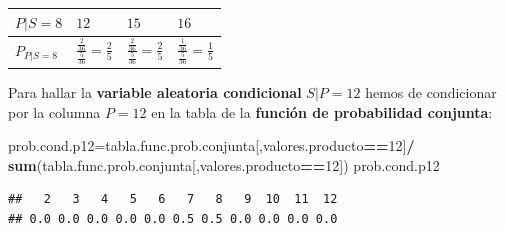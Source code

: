 \documentclass[]{book}
\newenvironment{Shaded}{\begin{snugshade}}{\end{snugshade}}
\newcommand{\DecValTok}[1]{\textcolor[rgb]{0.00,0.00,0.81}{#1}}
\newcommand{\KeywordTok}[1]{\textcolor[rgb]{0.13,0.29,0.53}{\textbf{#1}}}
\newcommand{\NormalTok}[1]{#1}
\newcommand{\OperatorTok}[1]{\textcolor[rgb]{0.81,0.36,0.00}{\textbf{#1}}}
\newcommand{\StringTok}[1]{\textcolor[rgb]{0.31,0.60,0.02}{#1}}
\begin{document}
\begin{longtable}[]{@{}llll@{}}
\toprule
\begin{minipage}[b]{0.22\columnwidth}\raggedright
\(P|S=8\)\strut
\end{minipage} & \begin{minipage}[b]{0.22\columnwidth}\raggedright
\(12\)\strut
\end{minipage} & \begin{minipage}[b]{0.22\columnwidth}\raggedright
\(15\)\strut
\end{minipage} & \begin{minipage}[b]{0.22\columnwidth}\raggedright
\(16\)\strut
\end{minipage}\tabularnewline
\midrule
\endhead
\begin{minipage}[t]{0.22\columnwidth}\raggedright
\(P_{P|S=8}\)\strut
\end{minipage} & \begin{minipage}[t]{0.22\columnwidth}\raggedright
\(\frac{\frac{2}{36}}{\frac{5}{36}}=\frac{2}{5}\)\strut
\end{minipage} & \begin{minipage}[t]{0.22\columnwidth}\raggedright
\(\frac{\frac{2}{36}}{\frac{5}{36}}=\frac{2}{5}\)\strut
\end{minipage} & \begin{minipage}[t]{0.22\columnwidth}\raggedright
\(\frac{\frac{1}{36}}{\frac{5}{36}}=\frac{1}{5}\)\strut
\end{minipage}\tabularnewline
\bottomrule
\end{longtable}

Para hallar la \textbf{variable aleatoria condicional} \(S|P=12\) hemos de condicionar por la columna \(P=12\) en la tabla de la \textbf{función de probabilidad conjunta}:

\begin{Shaded}
\begin{Highlighting}[]
\NormalTok{prob.cond.p12=tabla.func.prob.conjunta[,valores.producto}\OperatorTok{==}\DecValTok{12}\NormalTok{]}\OperatorTok{/}
\StringTok{  }\KeywordTok{sum}\NormalTok{(tabla.func.prob.conjunta[,valores.producto}\OperatorTok{==}\DecValTok{12}\NormalTok{])}
\NormalTok{prob.cond.p12}
\end{Highlighting}
\end{Shaded}

\begin{verbatim}
##   2   3   4   5   6   7   8   9  10  11  12 
## 0.0 0.0 0.0 0.0 0.0 0.5 0.5 0.0 0.0 0.0 0.0
\end{verbatim}
\end{document}
